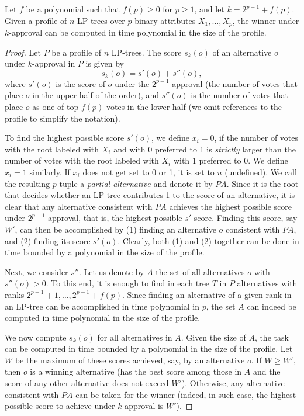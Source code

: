 \begin{thm}
\label{thm1}
Let $f$ be a polynomial such that $f(p)\geq 0$ for $p\geq 1$, and let
$k=2^{p-1}+f(p)$. Given 
a profile of $n$ LP-trees over $p$ binary attributes $X_1,\ldots,X_p$, the 
winner under $k$-approval can be computed in time polynomial in the
size of the profile.
\end{thm}
\begin{proof}
Let $P$ be a profile of $n$ LP-trees. The score $s_k(o)$ of an alternative
$o$ under $k$-approval in $P$ is given by 
\[
s_k(o) = s'(o)+s''(o),
\]
where $s'(o)$ is the score of $o$ under the $2^{p-1}$-approval (the number
of votes that place $o$ in the upper half of the order), and $s''(o)$ is the
number of votes that place $o$ as one of top $f(p)$ votes in the lower 
half (we omit references to the profile to simplify the notation).

To find the highest possible score $s'(o)$, we define $x_i=0$, if 
the number of votes with the root labeled with $X_i$ and with 0 preferred
to 1 is \emph{strictly} larger than the number of votes with the root 
labeled with $X_i$ with 1 preferred to 0. We define $x_i=1$ similarly.
If $x_i$ does not get set to 0 or 1, it is set to $u$ (undefined). We
call the resulting $p$-tuple a \emph{partial alternative} and denote 
it by $PA$. Since it is the root that decides whether an LP-tree 
contributes 1 to the score of an alternative, it is clear that any 
alternative consistent with $PA$ achieves the highest possible 
score under $2^{p-1}$-approval, that is, the highest possible $s'$-score.  
Finding this score, say $W'$, can then be accomplished by (1) finding
an alternative $o$ consistent with $PA$, and (2) finding its score $s'(o)$.
Clearly, both (1) and (2) together can be done in time bounded by a polynomial 
in the size of the profile.

Next, we consider $s''$. Let us denote by $A$ the set of all alternatives 
$o$ with $s''(o)>0$. To this end, it is enough
to find in each tree $T$ in $P$ alternatives with ranks $2^{p-1}+1,
\ldots, 2^{p-1}+f(p)$. Since finding an alternative of a given rank in 
an LP-tree can be accomplished in time polynomial in $p$, the set $A$ 
can indeed be computed in time polynomial in the size of the profile.

We now compute $s_k(o)$ for all alternatives in $A$. Given the size of
$A$, the task can be computed in time bounded by a polynomial in the size
of the profile. Let $W$ be the maximum of these scores achieved, say, by an
alternative $o$. If $W\geq W'$, then $o$ is a winning alternative (has 
the best score among those in $A$ and the score of any other alternative 
does not exceed $W'$). Otherwise, any alternative consistent with $PA$ 
can be taken for the winner (indeed, in such case, the highest possible 
score to achieve under $k$-approval is $W'$). 
\end{proof}

